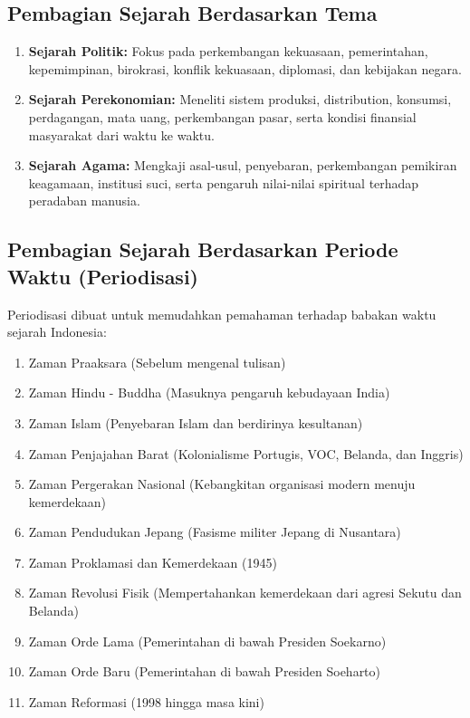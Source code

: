 \documentclass[12pt, a4paper]{article}
\begin{document}
\subsection{Pembagian Sejarah Berdasarkan Tema}
\begin{enumerate}
	\item \textbf{Sejarah Politik:} Fokus pada perkembangan kekuasaan, pemerintahan, kepemimpinan, birokrasi, konflik kekuasaan, diplomasi, dan kebijakan negara.
	\item \textbf{Sejarah Perekonomian:} Meneliti sistem produksi, distribution, konsumsi, perdagangan, mata uang, perkembangan pasar, serta kondisi finansial masyarakat dari waktu ke waktu.
	\item \textbf{Sejarah Agama:} Mengkaji asal-usul, penyebaran, perkembangan pemikiran keagamaan, institusi suci, serta pengaruh nilai-nilai spiritual terhadap peradaban manusia.
\end{enumerate}

\subsection{Pembagian Sejarah Berdasarkan Periode Waktu (Periodisasi)}
Periodisasi dibuat untuk memudahkan pemahaman terhadap babakan waktu sejarah Indonesia:
\begin{enumerate}
	\item Zaman Praaksara (Sebelum mengenal tulisan)
	\item Zaman Hindu - Buddha (Masuknya pengaruh kebudayaan India)
	\item Zaman Islam (Penyebaran Islam dan berdirinya kesultanan)
	\item Zaman Penjajahan Barat (Kolonialisme Portugis, VOC, Belanda, dan Inggris)
	\item Zaman Pergerakan Nasional (Kebangkitan organisasi modern menuju kemerdekaan)
	\item Zaman Pendudukan Jepang (Fasisme militer Jepang di Nusantara)
	\item Zaman Proklamasi dan Kemerdekaan (1945)
	\item Zaman Revolusi Fisik (Mempertahankan kemerdekaan dari agresi Sekutu dan Belanda)
	\item Zaman Orde Lama (Pemerintahan di bawah Presiden Soekarno)
	\item Zaman Orde Baru (Pemerintahan di bawah Presiden Soeharto)
	\item Zaman Reformasi (1998 hingga masa kini)
\end{enumerate}
\end{document}

